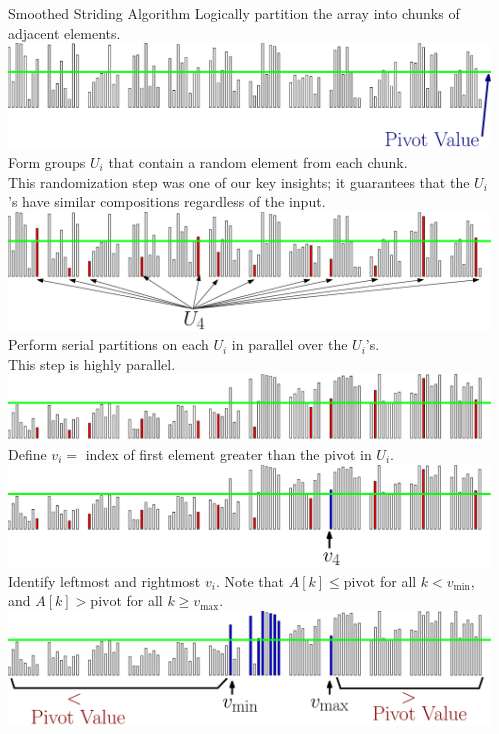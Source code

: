 \documentclass[table,serif,mathserif,final]{beamer}
\theoremstyle{remark}
\begin{document}
\begin{frame}{}
\begin{columns}[t]
\begin{column}{0.005\linewidth}
\end{column}
  \begin{column}{0.295\linewidth}
\begin{block}{\Huge Smoothed Striding Algorithm}
  \Huge
	Logically partition the array into chunks of adjacent elements.
	\includegraphics[width=\linewidth]{imgs/smoothedStridingAlgSim/sim1.eps}
	Form groups $U_i$ that contain a random element from each chunk. \\
  {\color{blue}This randomization step was one of our key insights; it guarantees that the $U_i$'s have similar compositions regardless of the input.}
	\includegraphics[width=\linewidth]{imgs/smoothedStridingAlgSim/sim2.eps}
	Perform serial partitions on each $U_i$ in parallel over the $U_i$'s. \\
  This step is highly parallel.
	\includegraphics[width=\linewidth]{imgs/smoothedStridingAlgSim/sim3.eps}
  Define $v_i = $ index of first element greater than the pivot in $U_i$. 
	\includegraphics[width=\linewidth]{imgs/smoothedStridingAlgSim/sim35.eps}
  Identify leftmost and rightmost $v_i$. Note that $A[k] \le \text{pivot}$ for all $k < v_{\min}$, and $A[k] > \text{pivot}$ for all $k \ge v_{\max}$.
	\includegraphics[width=\linewidth]{imgs/smoothedStridingAlgSim/sim4.eps}

\end{block}
\end{column}
\end{columns}
\end{frame}
\end{document}

